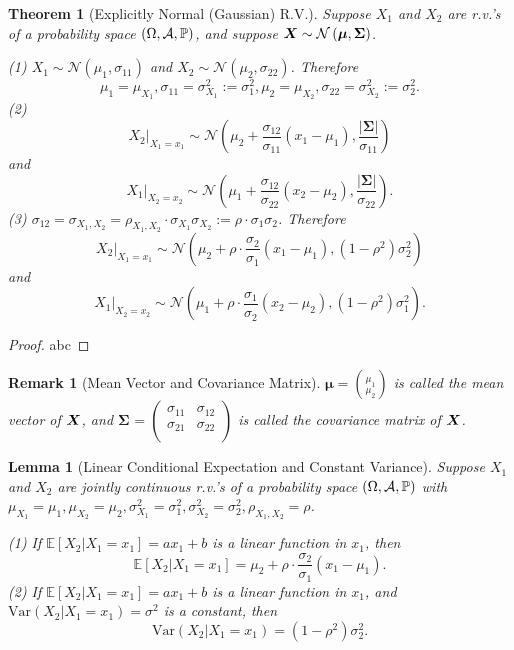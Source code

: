 \documentclass[openany,12pt]{book}
\newtheorem{theorem}{Theorem}[chapter]
\newtheorem{remark}{Remark}[chapter]
\newtheorem{lemma}{Lemma}[chapter]
\begin{document}
\begin{theorem}[Explicitly Normal (Gaussian) R.V.]
  Suppose $X_{1}$ and $X_{2}$ are r.v.'s of a probability space $(\Omega,\mathcal{A},\mathbb{P})$, and suppose $\bm{X}\sim \mathcal{N}\left(\bm{\mu},\bm{\Sigma} \right)$.

  (1) $X_{1}\sim \mathcal{N}\left( \mu_{1},\sigma_{11} \right)$ and
  $X_{2}\sim \mathcal{N}\left( \mu_{2},\sigma_{22} \right)$. Therefore
  \[\mu_{1} = \mu_{X_{1}}, \sigma_{11} = \sigma_{X_{1}}^{2} := \sigma_{1}^{2}, \mu_{2} = \mu_{X_{2}}, \sigma_{22} = \sigma_{X_{2}}^{2} := \sigma_{2}^{2}.\]
  (2)
  \[X_{2}|_{X_{1} = x_{1}}\sim \mathcal{N}\left( \mu_{2} + \frac{\sigma_{12}}{\sigma_{11}}\left( x_{1} - \mu_{1} \right), \frac{\left| \bm{\Sigma} \right|}{\sigma_{11}} \right)\]
  and
  \[X_{1}|_{X_{2} = x_{2}}\sim \mathcal{N}\left( \mu_{1} + \frac{\sigma_{12}}{\sigma_{22}}\left( x_{2} - \mu_{2} \right), \frac{\left|\bm{\Sigma}\right|}{\sigma_{22}} \right).\]
  (3)
  $\sigma_{12} = \sigma_{X_{1},X_{2}} = \rho_{X_{1},X_{2}} \cdot \sigma_{X_{1}}\sigma_{X_{2}} := \rho \cdot \sigma_{1}\sigma_{2}$. Therefore
  \[X_{2}|_{X_{1} = x_{1}}\sim \mathcal{N}\left( \mu_{2} + \rho\cdot\frac{\sigma_{2}}{\sigma_{1}}\left( x_{1} - \mu_{1} \right),\left(1 - \rho^{2}\right)\sigma_{2}^{2} \right)\]
  and
  \[X_{1}|_{X_{2} = x_{2}}\sim \mathcal{N}\left( \mu_{1} + \rho\cdot\frac{\sigma_{1}}{\sigma_{2}}\left( x_{2} - \mu_{2} \right),\left(1 - \rho^{2}\right)\sigma_{1}^{2} \right).\]
\end{theorem}

\begin{proof}
  abc
\end{proof}

\begin{remark}[Mean Vector and Covariance Matrix]
  $\bm{\mu}= \binom{\mu_{1}}{\mu_{2}}$ is called the mean vector of $\bm{X}$, and $\bm{\Sigma}_{}^{} = \begin{pmatrix}
      \sigma_{11} & \sigma_{12} \\
      \sigma_{21} & \sigma_{22} \\
    \end{pmatrix}$ is called the covariance matrix of $\bm{X}$.
\end{remark}

\begin{lemma}[Linear Conditional Expectation and Constant Variance]
  Suppose $X_{1}$ and $X_{2}$ are jointly continuous r.v.'s of a probability
  space $(\Omega,\mathcal{A},\mathbb{P})$ with $\mu_{X_{1}} = \mu_{1},  \mu_{X_{2}} = \mu_{2}, \sigma_{X_{1}}^{2} = \sigma_{1}^{2}, \sigma_{X_{2}}^{2} = \sigma_{2}^{2}, \rho_{X_{1},X_{2}} = \rho$.

  (1) If
  $\mathbb{E}[ X_{2} | X_{1} = x_{1}] = ax_{1} + b$
  is a linear function in $x_{1}$, then
  \[\mathbb{E}[ X_{2} | X_{1} = x_{1}] = \mu_{2} + \rho\cdot\frac{\sigma_{2}}{\sigma_{1}}\left( x_{1} - \mu_{1} \right).\]
  (2) If
  $\mathbb{E}[ X_{2} | X_{1} = x_{1}]= ax_{1} + b$
  is a linear function in $x_{1}$, and
  $\mathrm{Var}( X_{2}| X_{1} = x_{1})= \sigma^{2}$
  is a constant, then
  \[\mathrm{Var}( X_{2} | X_{1} = x_{1})= \left( 1 - \rho^{2} \right)\sigma_{2}^{2}.\]
\end{lemma}
\end{document}
